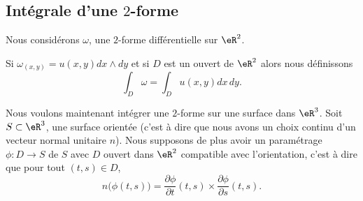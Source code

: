 \subsection{Intégrale d'une \( 2\)-forme}

Nous considérons \( \omega\), une \( 2\)-forme différentielle sur \( \eR^2\).
\begin{definition}
    Si \( \omega_{(x,y)}=u(x,y)dx\wedge dy\) et si \( D\) est un ouvert de \( \eR^2\) alors nous définissons
    \begin{equation}
        \int_D\omega=\int_D u(x,y)dx\,dy.
    \end{equation}
\end{definition}

Nous voulons maintenant intégrer une \( 2\)-forme sur une surface dans \( \eR^3\). Soit \( S\subset \eR^3\), une surface orientée (c'est à dire que nous avons un choix continu d'un vecteur normal unitaire \( n\)). Nous supposons de plus avoir un paramétrage \( \phi\colon D\to S\) de \( S\) avec \( D\) ouvert dans \( \eR^2\) compatible avec l'orientation, c'est à dire que pour tout \( (t,s)\in D\),
\begin{equation}
    n\big( \phi(t,s) \big)=\frac{ \partial \phi }{ \partial t }(t,s)\times \frac{ \partial \phi }{ \partial s }(t,s).
\end{equation}

